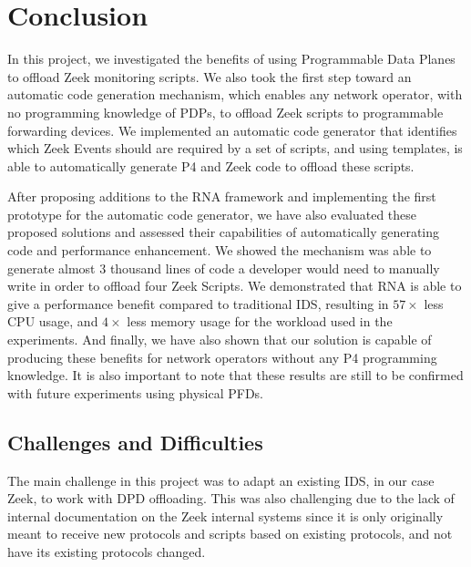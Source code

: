 \chapter{Conclusion}
\label{cap:conclusion}

In this project, we investigated the benefits of using Programmable Data Planes to offload Zeek monitoring scripts. We also took the first step toward an automatic code generation mechanism, which enables any network operator, with no programming knowledge of PDPs, to offload Zeek scripts to programmable forwarding devices. We implemented an automatic code generator that identifies which Zeek Events should are required by a set of scripts, and using templates, is able to automatically generate P4 and Zeek code to offload these scripts.

After proposing additions to the RNA framework and implementing the first prototype for the automatic code generator, we have also evaluated these proposed solutions and assessed their capabilities of automatically generating code and performance enhancement. We showed the mechanism was able to generate almost $3$ thousand lines of code a developer would need to manually write in order to offload four Zeek Scripts. We demonstrated that RNA is able to give a performance benefit compared to traditional IDS, resulting in $57\times$ less CPU usage, and $4\times$ less memory usage for the workload used in the experiments. And finally, we have also shown that our solution is capable of producing these benefits for network operators without any P4 programming knowledge. It is also important to note that these results are still to be confirmed with future experiments using physical PFDs.

\section{Challenges and Difficulties}

The main challenge in this project was to adapt an existing IDS, in our case Zeek, to work with DPD offloading. This was also challenging due to the lack of internal documentation on the Zeek internal systems since it is only originally meant to receive new protocols and scripts based on existing protocols, and not have its existing protocols changed.


